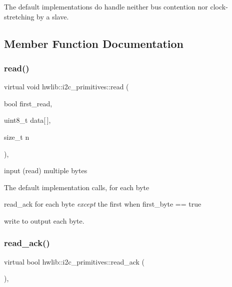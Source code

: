 The default implementations do handle neither bus contention nor clock-\/stretching by a slave. 

\subsection{Member Function Documentation}
\mbox{\label{classhwlib_1_1i2c__primitives_a2a8cc988531ea774d39d726f213f8585}} 
\subsubsection{\texorpdfstring{read()}{read()}}
{\footnotesize\ttfamily virtual void hwlib\+::i2c\+\_\+primitives\+::read (\begin{DoxyParamCaption}\item[{bool}]{first\+\_\+read,  }\item[{uint8\+\_\+t}]{data\mbox{[}$\,$\mbox{]},  }\item[{size\+\_\+t}]{n }\end{DoxyParamCaption})\hspace{0.3cm}{\ttfamily [inline]}, {\ttfamily [virtual]}}

input (read) multiple bytes

The default implementation calls, for each byte
\begin{DoxyItemize}
\item read\+\_\+ack for each byte {\itshape except} the first when first\+\_\+byte == true
\item write to output each byte. 
\end{DoxyItemize}\mbox{\label{classhwlib_1_1i2c__primitives_adfa6c493163d397f58a3e2ba4617dbac}} 
\subsubsection{\texorpdfstring{read\_ack()}{read\_ack()}}
{\footnotesize\ttfamily virtual bool hwlib\+::i2c\+\_\+primitives\+::read\+\_\+ack (\begin{DoxyParamCaption}{ }\end{DoxyParamCaption})\hspace{0.3cm}{\ttfamily [inline]}, {\ttfamily [virtual]}}

